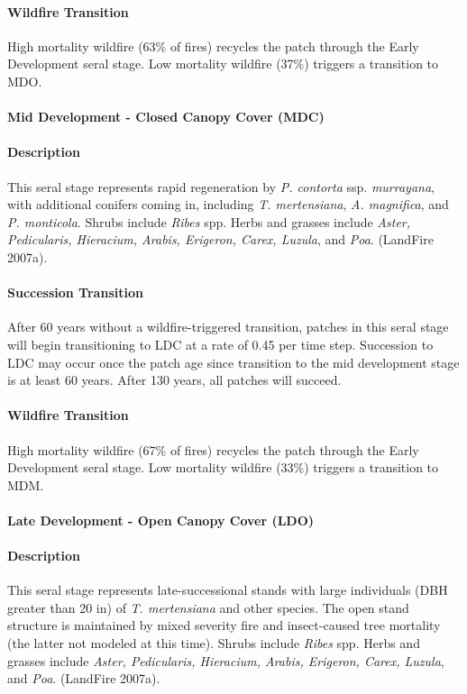 \paragraph{Wildfire Transition} High mortality wildfire (63\% of fires) recycles the patch through the Early Development seral stage. Low mortality wildfire (37\%) triggers a transition to MDO.

\noindent\hrulefill

\paragraph{Mid Development - Closed Canopy Cover (MDC)}

\paragraph{Description} This seral stage represents rapid regeneration by \emph{P. contorta} ssp. \emph{murrayana}, with additional conifers coming in, including \emph{T. mertensiana}, \emph{A. magnifica}, and \emph{P. monticola}. Shrubs include \emph{Ribes} spp. Herbs and grasses include \emph{Aster, Pedicularis, Hieracium, Arabis, Erigeron, Carex, Luzula}, and \emph{Poa}. (LandFire 2007a).

\paragraph{Succession Transition} After 60 years without a wildfire-triggered transition, patches in this seral stage will begin transitioning to LDC at a rate of 0.45 per time step. Succession to LDC may occur once the patch age since transition to the mid development stage is at least 60 years. After 130 years, all patches will succeed.

\paragraph{Wildfire Transition} High mortality wildfire (67\% of fires) recycles the patch through the Early Development seral stage. Low mortality wildfire (33\%) triggers a transition to MDM.

\noindent\hrulefill


\paragraph{Late Development - Open Canopy Cover (LDO)}

\paragraph{Description} This seral stage represents late-successional stands with large individuals (DBH greater than 20 in) of \emph{T. mertensiana} and other species. The open stand structure is maintained by mixed severity fire and insect-caused tree mortality (the latter not modeled at this time). Shrubs include \emph{Ribes} spp. Herbs and grasses include \emph{Aster, Pedicularis, Hieracium, Arabis, Erigeron, Carex, Luzula}, and \emph{Poa}. (LandFire 2007a).

